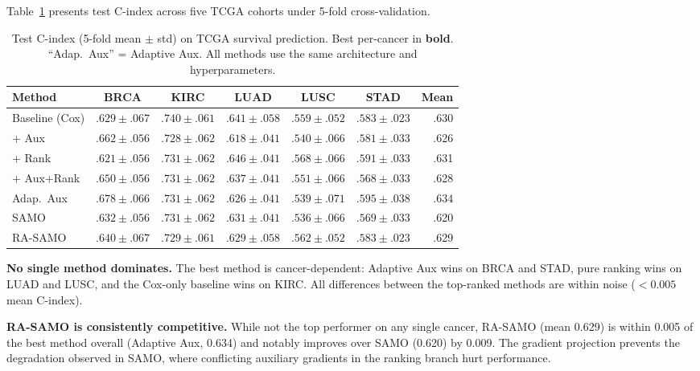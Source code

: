 \documentclass[10pt,twocolumn]{article}
\begin{document}
Table~\ref{tab:tcga_results} presents test C-index across five TCGA
cohorts under 5-fold cross-validation.

\begin{table}[t]
\centering
\caption{Test C-index (5-fold mean $\pm$ std) on TCGA survival
prediction. Best per-cancer in \textbf{bold}. ``Adap.~Aux'' =
Adaptive Aux. All methods use the same architecture and hyperparameters.}
\label{tab:tcga_results}
\begin{tabular}{lcccccr}
\toprule
Method & BRCA & KIRC & LUAD & LUSC & STAD & Mean \\
\midrule
Baseline (Cox) &
  $.629 \pm .067$ &
  $\mathbf{.740} \pm .061$ &
  $.641 \pm .058$ &
  $.559 \pm .052$ &
  $.583 \pm .023$ &
  .630 \\
+ Aux &
  $.662 \pm .056$ &
  $.728 \pm .062$ &
  $.618 \pm .041$ &
  $.540 \pm .066$ &
  $.581 \pm .033$ &
  .626 \\
+ Rank &
  $.621 \pm .056$ &
  $.731 \pm .062$ &
  $\mathbf{.646} \pm .041$ &
  $\mathbf{.568} \pm .066$ &
  $.591 \pm .033$ &
  .631 \\
+ Aux+Rank &
  $.650 \pm .056$ &
  $.731 \pm .062$ &
  $.637 \pm .041$ &
  $.551 \pm .066$ &
  $.568 \pm .033$ &
  .628 \\
Adap.\ Aux &
  $\mathbf{.678} \pm .066$ &
  $.731 \pm .062$ &
  $.626 \pm .041$ &
  $.539 \pm .071$ &
  $\mathbf{.595} \pm .038$ &
  $\mathbf{.634}$ \\
SAMO &
  $.632 \pm .056$ &
  $.731 \pm .062$ &
  $.631 \pm .041$ &
  $.536 \pm .066$ &
  $.569 \pm .033$ &
  .620 \\
RA-SAMO &
  $.640 \pm .067$ &
  $.729 \pm .061$ &
  $.629 \pm .058$ &
  $.562 \pm .052$ &
  $.583 \pm .023$ &
  .629 \\
\bottomrule
\end{tabular}
\end{table}

\textbf{No single method dominates.} The best method is
cancer-dependent: Adaptive Aux wins on BRCA and STAD, pure ranking
wins on LUAD and LUSC, and the Cox-only baseline wins on KIRC. All
differences between the top-ranked methods are within noise
($< 0.005$ mean C-index).

\textbf{RA-SAMO is consistently competitive.} While not the top
performer on any single cancer, RA-SAMO (mean 0.629) is within
0.005 of the best method overall (Adaptive Aux, 0.634) and notably
improves over SAMO (0.620) by 0.009. The gradient projection
prevents the degradation observed in SAMO, where conflicting
auxiliary gradients in the ranking branch hurt performance.
\end{document}
